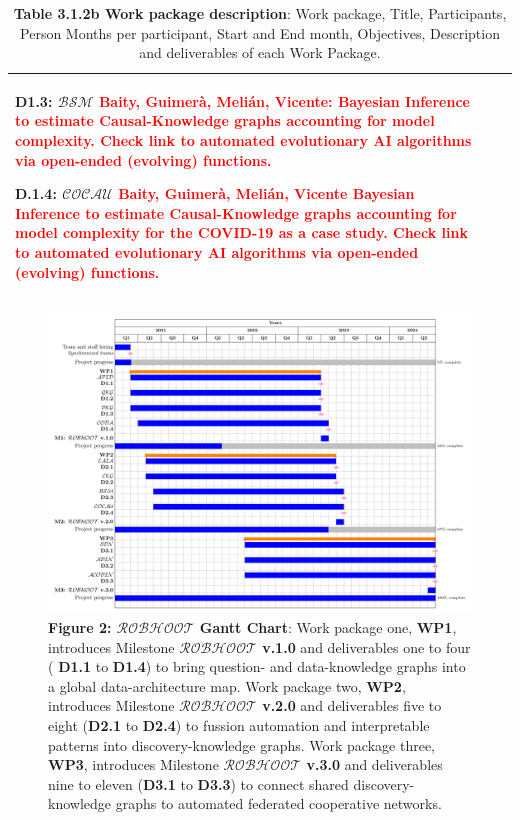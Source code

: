 \documentclass[11pt, a4paper]{article} %
\begin{document}
\begin{table}[h!]
\begin{center}
\begin{tabular}{|m{3cm} || m{12cm} || m{1cm}|}
                         {\bf D1.3: $\mathcal{BSM}$} \textcolor{red}{{\bf Baity, Guimer\`a, Meli\'an, Vicente}:
                         Bayesian Inference to estimate Causal-Knowledge graphs accounting for model complexity.                          Check link to automated evolutionary AI algorithms via open-ended (evolving) functions.}

                         {\bf D.1.4: $\mathcal{COCAU}$} \textcolor{red}{{\bf Baity, Guimer\`a, Meli\'an, Vicente}
                         Bayesian Inference to estimate Causal-Knowledge graphs accounting for model
                         complexity for the COVID-19 as a case study.
                         Check link to automated evolutionary AI algorithms via open-ended (evolving) functions.} &  \\
    \hline\hline
    \hline\hline
\end{tabular}
\end{center}
\caption*{{{\bf Table 3.1.2b Work package description}: Work package,
    Title, Participants, Person Months per participant, Start and End
    month, Objectives, Description and deliverables of each Work
    Package.}}
\end{table}


 \begin{figure}[h!]
   \includegraphics[width=1\textwidth]{Figures/GanttChart.pdf}
   \caption*{{\small {\bf Figure 2: $\mathcal{ROBHOOT}$ Gantt Chart}:
       Work package one, {\bf WP1}, introduces Milestone {\bf
         $\mathcal{ROBHOOT}$ v.1.0} and deliverables one to four ({\bf
         D1.1} to {\bf D1.4}) to bring question- and data-knowledge
       graphs into a global data-architecture map. Work package two,
       {\bf WP2}, introduces Milestone {\bf $\mathcal{ROBHOOT}$ v.2.0}
       and deliverables five to eight ({\bf D2.1} to {\bf D2.4}) to
       fussion automation and interpretable patterns into
       discovery-knowledge graphs. Work package three, {\bf WP3},
       introduces Milestone {\bf $\mathcal{ROBHOOT}$ v.3.0} and
       deliverables nine to eleven ({\bf D3.1} to {\bf D3.3}) to
       connect shared discovery-knowledge graphs to automated
       federated cooperative networks.}}
\end{figure}
\end{document}
